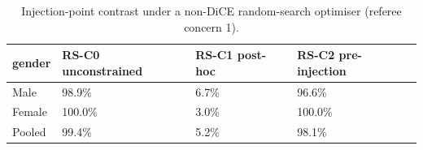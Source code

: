 \begin{table}
\caption{Injection-point contrast under a non-DiCE random-search optimiser (referee concern 1).}
\label{tab:rev_optindep}
\begin{tabular}{llll}
\toprule
gender & RS-C0 unconstrained & RS-C1 post-hoc & RS-C2 pre-injection \\
\midrule
Male & 98.9\% & 6.7\% & 96.6\% \\
Female & 100.0\% & 3.0\% & 100.0\% \\
Pooled & 99.4\% & 5.2\% & 98.1\% \\
\bottomrule
\end{tabular}
\end{table}
